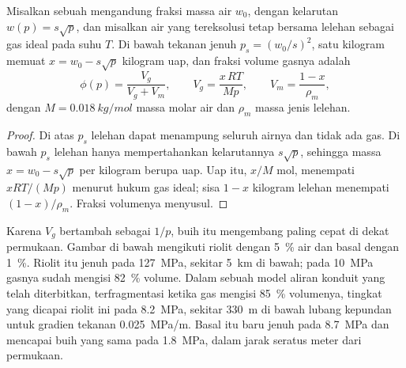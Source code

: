 \begin{proposition}\label{prop:b2:eruptive-styles:gas}
Misalkan sebuah  mengandung fraksi massa air $w_0$, dengan kelarutan $w(p) =
s\sqrt p$, dan misalkan air yang tereksolusi tetap bersama lelehan sebagai gas
ideal pada suhu $T$. Di bawah tekanan jenuh $p_s = (w_0/s)^2$, satu
kilogram  memuat $x = w_0 - s\sqrt p$ kilogram uap, dan fraksi
volume gasnya adalah
\[
\phi(p) = \frac{V_g}{V_g + V_m}, \qquad V_g = \frac{x\,RT}{M p}, \qquad
V_m = \frac{1 - x}{\rho_m},
\]
dengan $M = \qty{0.018}{kg/mol}$ massa molar air dan $\rho_m$ massa jenis
lelehan.
\end{proposition}

\begin{proof}
Di atas $p_s$ lelehan dapat menampung seluruh airnya dan tidak ada gas. Di bawah $p_s$
lelehan hanya mempertahankan kelarutannya $s\sqrt p$, sehingga massa $x = w_0 - s\sqrt p$ per
kilogram  berupa uap. Uap itu, $x/M$ mol, menempati $xRT/(Mp)$ menurut
hukum gas ideal; sisa $1 - x$ kilogram lelehan menempati $(1 - x)/\rho_m$.
Fraksi volumenya menyusul.
\end{proof}

Karena $V_g$ bertambah sebagai $1/p$, buih itu mengembang paling cepat di dekat permukaan.
Gambar di bawah mengikuti riolit dengan \qty{5}{\percent} air dan basal
dengan \qty{1}{\percent}. Riolit itu jenuh pada \qty{127}{MPa}, sekitar
\qty{5}{km} di bawah; pada \qty{10}{MPa} gasnya sudah mengisi \qty{82}{\percent}
volume. Dalam sebuah model aliran konduit yang telah diterbitkan,  terfragmentasi ketika
gas mengisi \qty{85}{\percent} volumenya, tingkat yang dicapai riolit ini pada
\qty{8.2}{MPa}, sekitar \qty{330}{m} di bawah lubang kepundan untuk gradien tekanan
\qty{0.025}{MPa/m}. Basal itu baru jenuh pada \qty{8.7}{MPa} dan mencapai
buih yang sama pada \qty{1.8}{MPa}, dalam jarak seratus meter dari permukaan.


